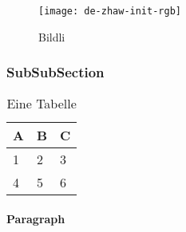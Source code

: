 \begin{figure}[H]
    \centering
    \texttt{[image: de-zhaw-init-rgb]}
    \caption{Bildli}
    \label{fig:bildli1}
    \end{figure}
    
    
    \subsubsection{SubSubSection}
    \lipsum[1]
    \begin{table}[H]
    \centering
    \caption{Eine Tabelle}
    \label{tab:my-table}
    \begin{tabular}{|l|l|l|}
    \hline
    \textbf{A} & \textbf{B} & \textbf{C} \\ \hline
    1          & 2          & 3          \\ \hline
    4          & 5          & 6          \\ \hline
    \end{tabular}
    \end{table}
    
    \paragraph{Paragraph}
    \lipsum[1]